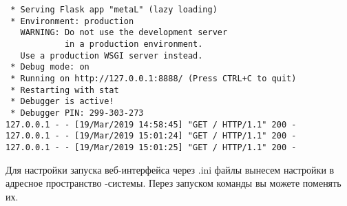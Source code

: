 \smallskip
{}

\begin{verbatim}
 * Serving Flask app "metaL" (lazy loading)
 * Environment: production
   WARNING: Do not use the development server
            in a production environment.
   Use a production WSGI server instead.
 * Debug mode: on
 * Running on http://127.0.0.1:8888/ (Press CTRL+C to quit)
 * Restarting with stat
 * Debugger is active!
 * Debugger PIN: 299-303-273
127.0.0.1 - - [19/Mar/2019 14:58:45] "GET / HTTP/1.1" 200 -
127.0.0.1 - - [19/Mar/2019 15:01:24] "GET / HTTP/1.1" 200 -
127.0.0.1 - - [19/Mar/2019 15:01:25] "GET / HTTP/1.1" 200 -
\end{verbatim}


Для настройки запуска веб-интерфейса через .ini файлы вынесем настройки в
адресное пространство \F-системы. Перез запуском команды  вы можете
поменять их.

\medskip
{}















\secup
